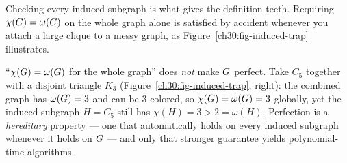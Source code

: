Checking every induced subgraph is what gives the definition teeth. Requiring $\chi(G)=\omega(G)$ on the whole graph alone is satisfied by accident whenever you attach a large clique to a messy graph, as Figure~\ref{ch30:fig-induced-trap} illustrates.

\begin{trapbox}
``$\chi(G)=\omega(G)$ for the whole graph'' does \emph{not} make $G$ perfect. Take $C_5$ together with a disjoint triangle $K_3$ (Figure~\ref{ch30:fig-induced-trap}, right): the combined graph has $\omega(G)=3$ and can be $3$-colored, so $\chi(G)=\omega(G)=3$ globally, yet the induced subgraph $H=C_5$ still has $\chi(H)=3>2=\omega(H)$. Perfection is a \emph{hereditary} property --- one that automatically holds on every induced subgraph whenever it holds on $G$ --- and only that stronger guarantee yields polynomial-time algorithms.
\end{trapbox}

